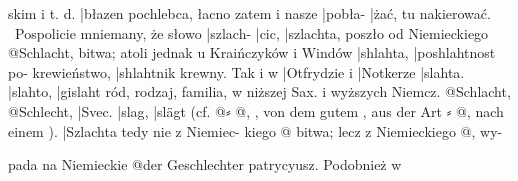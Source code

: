 skim i t. d. |{błazen} pochlebca, łacno zatem i nasze |{pobła-}
|{żać}, tu nakierować. \textemdash \ Pospolicie mniemany, że słowo |{szlach-}
|{cic}, |{szlachta}, poszło od Niemieckiego @{Schlacht}, bitwa; atoli
jednak u Kraińczyków i Windów |{shlahta}, %
|{poshlahtnost} %
po-
krewieństwo, |{shlahtnik} krewny. Tak i w |{Otfrydzie} i |{Notkerze}
|{slahta}. %
|{slahto}, |{gislaht} ród, rodzaj, familia, w niższej Sax. i
wyższych Niemcz. @{Schlacht}, @{Schlecht}, |{Svec.} |{slag}, |{slägt} %
(cf. @{}⸗
@{, , von dem gutem , aus der Art }⸗
@{, nach einem }). |{Szlachta} tedy nie z Niemiec-
kiego @{} bitwa; lecz z Niemieckiego @{}, wy- %

pada na Niemieckie @{der Geschlechter} patrycyusz. Podobnież w %

